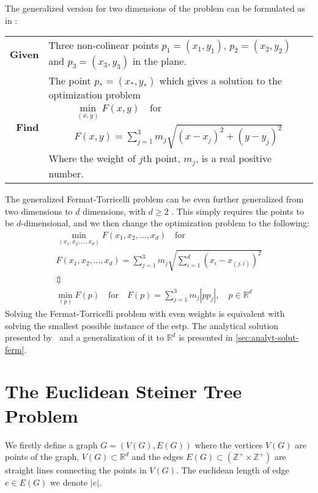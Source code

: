 The generalized version for two dimensions of the problem can be formulated as in
\textcite{uteshev2014}:
%
\begin{center}
  \begin{tabular}{rp{9cm}}
    \toprule
    \textbf{Given} & Three non-colinear points $p_1 = (x_1, y_1)$, $p_2 = (x_2,
                     y_2)$ and $p_3 = (x_3, y_3)$ in the plane. \\
    \textbf{Find} & The point $p_\ast = (x_\ast, y_\ast)$ which gives a solution
                    to the optimization problem
                    \begin{gather}
                      \min_{(x,y)} F(x,y) \quad \text{for} \\
                      F(x,y) = \sum_{j=1}^3 m_j \sqrt{{(x-x_j)}^2 + {(y-y_j)}^2}
                    \end{gather}
    Where the weight of $j$th point, $m_j$, is a real positive number. \\
    \bottomrule
  \end{tabular}
\end{center}
%
The generalized Fermat-Torricelli problem can be even further generalized from
two dimensions to $d$ dimensions, with $d \ge 2$
\cite{fermattorricelliproblem}. This simply requires the points to be
$d$-dimensional, and we then change the optimization problem to the following:
%
\begin{gather}
  \min_{(x_1, x_2, \ldots, x_d)} F(x_1, x_2, \ldots, x_d) \quad \text{for} \\
  F(x_1, x_2, \ldots, x_d) = \sum_{j=1}^3 m_j
  \sqrt{\sum_{i=1}^d {(x_i - x_{(j,i)})}^2 }
  \\ \Updownarrow \\
  \label{eq:4}
  \min_{(p)} F(p) \quad \text{for} \quad
  F(p) = \sum_{j=1}^3 m_j | p p_j |, \quad p \in \mathbb{R}^d
\end{gather}
%
Solving the Fermat-Torricelli problem with even weights is equivalent with solving
the smallest possible instance of the \acl{estp}. The analytical solution
presented by~\textcite{uteshev2014} and a generalization of it to $\mathbb{R}^d$ is
presented in \cref{sec:analyt-solut-ferm}.

\section{The Euclidean Steiner Tree Problem}
\label{sec:eucl-stein-tree}

We firstly define a graph $G = (V(G), E(G))$ where the vertices $V(G)$ are
points of the graph, $V(G) \subset \mathbb{R}^d$ and the edges
$E(G) \subset (\mathbb{Z}^{+} \times \mathbb{Z}^{+})$ are straight lines connecting the points in
$V(G)$. The euclidean length of edge $e \in E(G)$ we denote $|e|$.

